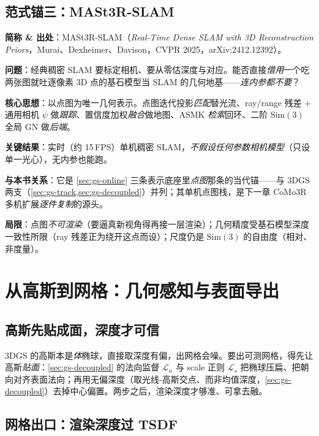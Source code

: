 \subsection{范式锚三：MASt3R-SLAM}

\begin{paper}
\textbf{简称 \& 出处}：MASt3R-SLAM（\emph{Real-Time Dense SLAM with 3D Reconstruction Priors}，Murai、Dexheimer、Davison，CVPR 2025，arXiv:2412.12392）\cite{murai2025mast3rslam}。

\textbf{问题}：经典稠密 SLAM 要标定相机、要从零估深度与对应。能否直接\emph{借用}一个吃两张图就吐逐像素 3D 点的基石模型当 SLAM 的几何地基——\emph{连内参都不要}？

\textbf{核心思想}：以点图为唯一几何表示。点图迭代投影\emph{匹配}替光流、ray/range 残差 $+$ 通用相机 $\psi$ 做\emph{跟踪}、置信度加权\emph{融合}做地图、ASMK \emph{检索}回环、二阶 $\mathrm{Sim}(3)$ 全局 GN 做\emph{后端}。

\textbf{关键结果}：实时（约 15\,FPS）单机稠密 SLAM，\emph{不假设任何参数相机模型}（只设单一光心），无内参也能跑。

\textbf{与本书关系}：它是 \cref{sec:gs-online} 三条表示底座里\emph{点图}那条的当代锚——与 3DGS 两支（\cref{sec:gs-track,sec:gs-decoupled}）并列；其单机点图栈，是下一章 CoMo3R 多机扩展\emph{逐件复制}的源头。

\textbf{局限}：点图\emph{不可渲染}（要逼真新视角得再接一层渲染）；几何精度受基石模型深度一致性所限（ray 残差正为绕开这点而设）；尺度仍是 $\mathrm{Sim}(3)$ 的自由度（相对、非度量）。
\end{paper}

\section{从高斯到网格：几何感知与表面导出}
\label{sec:gs-geom}

\subsection{高斯先贴成面，深度才可信}

3DGS 的高斯本是\emph{体}椭球，直接取深度有偏，出网格会噪。要出可测网格，得先让高斯\emph{贴面}：\cref{sec:gs-decoupled} 的法向监督 $\mathcal L_n$ 与 scale 正则 $\mathcal L_s$ 把椭球压扁、把朝向对齐表面法向；再用无偏深度（取光线-高斯交点、而非均值深度，\cref{sec:gs-decoupled}）去掉中心偏置。两步之后，渲染深度才够准、可拿去融。

\subsection{网格出口：渲染深度过 TSDF}

